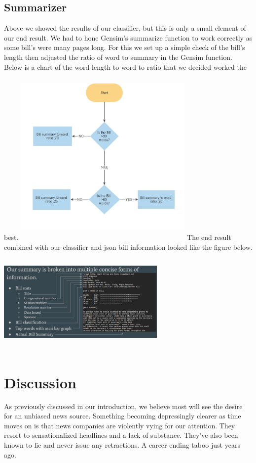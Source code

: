 \documentclass[11pt,a4paper]{article}
\begin{document}
\subsection{Summarizer} Above we showed the results of our classifier, but this is only a small element of our end result. We had to hone Gensim's summarize function to work correctly as some bill's were many pages long. For this we set up a simple check of the bill's length then adjusted the ratio of word to summary in the Gensim function. Below is a chart of the word length to word to ratio that we decided worked the best.
\noindent\newline\newline\includegraphics[width=8.8cm, height=9cm]{figs/Flowchart.JPG}
\newline\newline
The end result combined with our classifier and json bill information looked like the figure below.
\noindent\newline\newline\includegraphics[width=8.2cm, height=5.3cm]{figs/Data.PNG}

\section{Discussion}
As previously discussed in our introduction, we believe most will see the desire for an unbiased news source. Something becoming depressingly clearer as time moves on is that news companies are violently vying for our attention. They resort to sensationalized headlines and a lack of substance. They've also been known to lie and never issue any retractions. A career ending taboo just years ago. 
\end{document}
